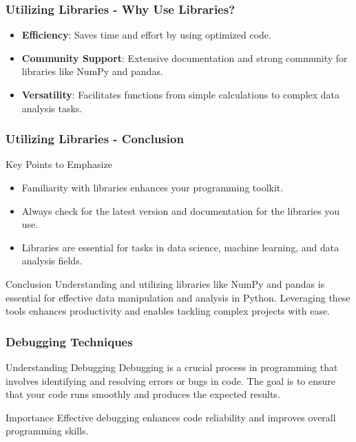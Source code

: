 \documentclass{beamer}
\begin{document}
\begin{frame}[fragile]
    \frametitle{Utilizing Libraries - Why Use Libraries?}
    \begin{itemize}
        \item \textbf{Efficiency}: Saves time and effort by using optimized code.
        \item \textbf{Community Support}: Extensive documentation and strong community for libraries like NumPy and pandas.
        \item \textbf{Versatility}: Facilitates functions from simple calculations to complex data analysis tasks.
    \end{itemize}
\end{frame}

\begin{frame}[fragile]
    \frametitle{Utilizing Libraries - Conclusion}
    \begin{block}{Key Points to Emphasize}
        \begin{itemize}
            \item Familiarity with libraries enhances your programming toolkit.
            \item Always check for the latest version and documentation for the libraries you use.
            \item Libraries are essential for tasks in data science, machine learning, and data analysis fields.
        \end{itemize}
    \end{block}
    \begin{block}{Conclusion}
        Understanding and utilizing libraries like NumPy and pandas is essential for effective data manipulation and analysis in Python. 
        Leveraging these tools enhances productivity and enables tackling complex projects with ease.
    \end{block}
\end{frame}

\begin{frame}[fragile]
    \frametitle{Debugging Techniques}
    \begin{block}{Understanding Debugging}
        Debugging is a crucial process in programming that involves identifying and resolving errors or bugs in code. 
        The goal is to ensure that your code runs smoothly and produces the expected results. 
    \end{block}
    \begin{block}{Importance}
        Effective debugging enhances code reliability and improves overall programming skills.
    \end{block}
\end{frame}
\end{document}
